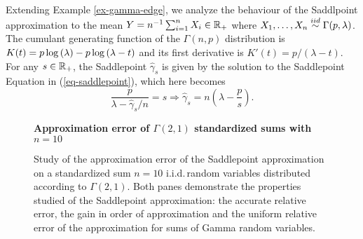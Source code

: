 \begin{example} \label{ex-gamma-saddle}
    Extending Example \ref{ex-gamma-edge}, we analyze the behaviour of the Saddlpoint approximation to the mean $Y = n^{-1}\sum_{i=1}^n X_i \in \mathbb{R}_+$ where $X_1, \ldots, X_n \stackrel{iid}{\sim} \Gamma(p, \lambda)$. The cumulant generating function of the $\Gamma(n, p)$ distribution is $K(t) = p\log\left(\lambda\right) - p\log\left(\lambda - t\right)$ and its first derivative is $K'(t) = p / (\lambda - t)$. For any $s \in \mathbb{R}_+$, the Saddlepoint $\hat\gamma_s$ is given by the solution to the Saddlepoint Equation in (\ref{eq-saddlepoint}), which here becomes
    \begin{equation*}
        \frac{p}{\lambda - \hat\gamma_s/n} = s \Rightarrow \hat\gamma_s = n\left(\lambda - \frac{p}{s}\right).
    \end{equation*}

    \begin{figure}[!htbp]
        \textbf{Approximation error of $\Gamma(2,1)$ standardized sums with $n=10$}
        \centering
        \caption{Study of the approximation error of the Saddlepoint approximation on a standardized sum $n=10$ i.i.d.\,random variables distributed according to $\Gamma(2, 1)$. Both panes demonstrate the properties studied of the Saddlepoint approximation: the accurate relative error, the gain in order of approximation and the uniform relative error of the approximation for sums of Gamma random variables.}
        \label{fig-saddlepoint-err}
    \end{figure}


\end{example}
